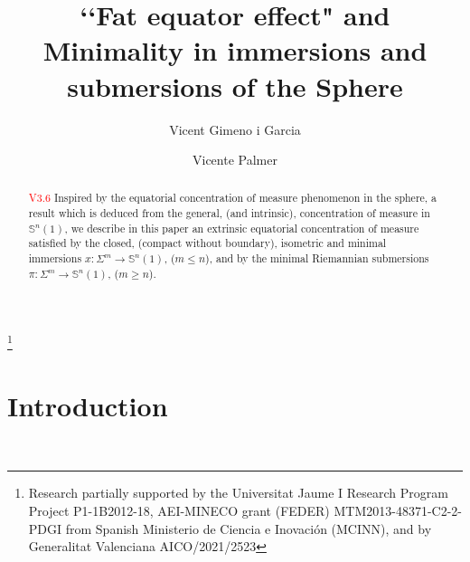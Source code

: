 \documentclass{amsart}
\theoremstyle{definition}
\theoremstyle{remark}
\newcommand{\ese}{\mathbb{S}}
\begin{document}
\title[Fat equator effect and minimality]{\lq\lq Fat equator effect" and Minimality in immersions and submersions of the Sphere}





\author{Vicent Gimeno i Garcia}
\address{Department of Mathematics, Universitat Jaume I-IMAC,   E-12071, 
Castell\'{o}, Spain}
\author{Vicente Palmer}
\address{Department of Mathematics, Universitat Jaume I-INIT,   E-12071, 
Castell\'{o}, Spain}

\thanks{Research partially supported by  the Universitat Jaume I Research Program Project P1-1B2012-18, AEI-MINECO grant (FEDER) MTM2013-48371-C2-2-PDGI from Spanish Ministerio de Ciencia e Inovaci\'{o}n (MCINN), and by Generalitat Valenciana AICO/2021/2523}





\dedicatory{}



\begin{abstract}\textcolor{red}{V3.6}
Inspired by the equatorial concentration of measure phenomenon in the sphere, a result which is deduced from the general, (and intrinsic), concentration of measure in $\ese^n(1)$, we describe in this paper an extrinsic equatorial concentration of measure satisfied by the closed, (compact without boundary), isometric and minimal immersions $x:\Sigma^m \rightarrow \ese^n(1)$, ($m \leq n$), and by the minimal Riemannian submersions $\pi: \Sigma^m \rightarrow \ese^n(1)$, ($m \geq n$).\end{abstract}

\maketitle

\section{Introduction}\label{sec:intro}\
\end{document}

